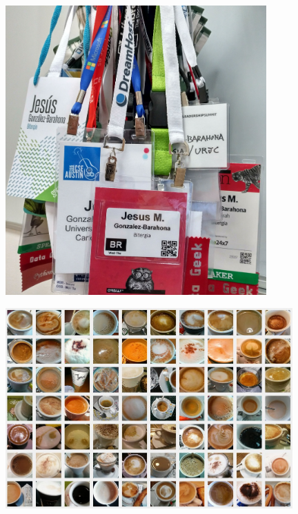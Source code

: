 \documentclass[17pt,aspectratio=169,hyperref=pdfusetitle]{beamer}
\begin{document}
\begin{frame}[fragile]

  \begin{center}
  \includegraphics[width=10cm]{figs/badges}
  \end{center}  
  
\end{frame}

\begin{frame}[fragile]

  \begin{center}
  \includegraphics[width=11cm]{figs/coffees}
  \end{center}  
  
\end{frame}
\end{document}
